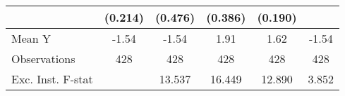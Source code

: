 {\begin{tabular}{l*{5}{c}}
            &     (0.214)         &     (0.476)         &     (0.386)         &     (0.190)         &                     \\
\midrule
Mean Y      &       -1.54         &       -1.54         &        1.91         &        1.62         &       -1.54         \\
Observations&         428         &         428         &         428         &         428         &         428         \\
Exc. Inst. F-stat&                     &      13.537         &      16.449         &      12.890         &       3.852         \\
\bottomrule
\end{tabular}
}
